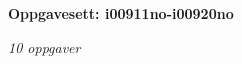 \centerline{\bf Oppgavesett: i00911no-i00920no}
\vskip 10pt
\centerline{\it 10 oppgaver}\vskip 10pt
\vskip 10pt

